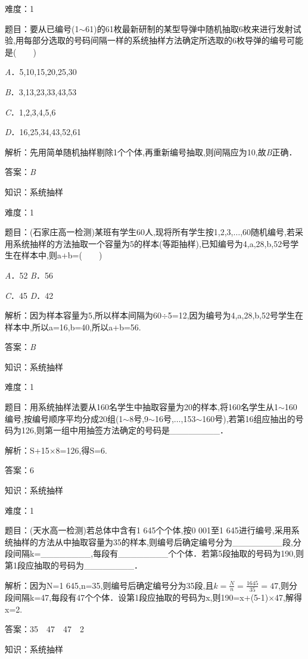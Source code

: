 \documentclass{article} %
\begin{document}
难度：1

题目：要从已编号(1$\sim$61)的61枚最新研制的某型导弹中随机抽取6枚来进行发射试验,用每部分选取的号码间隔一样的系统抽样方法确定所选取的6枚导弹的编号可能是(　　)

\textit{A}．5,10,15,20,25,30

\textit{B}．3,13,23,33,43,53

\textit{C}．1,2,3,4,5,6

\textit{D}．16,25,34,43,52,61

解析：先用简单随机抽样剔除1个个体,再重新编号抽取,则间隔应为10,故\textit{B}正确．

答案：\textit{B}

知识：系统抽样

难度：1

题目：(石家庄高一检测)某班有学生60人,现将所有学生按1,2,3,$\dots$,60随机编号,若采用系统抽样的方法抽取一个容量为5的样本(等距抽样),已知编号为4,a,28,b,52号学生在样本中,则a+b=(　　)

\textit{A}．52  \textit{B}．56

\textit{C}．45  \textit{D}．42

解析：因为样本容量为5,所以样本间隔为60$\mathrm{\div}$5=12,因为编号为4,a,28,b,52号学生在样本中,所以a=16,b=40,所以a+b=56.

答案：\textit{B}

知识：系统抽样

难度：1

题目：用系统抽样法要从160名学生中抽取容量为20的样本,将160名学生从1$\sim$160编号,按编号顺序平均分成20组(1$\sim$8号,9$\sim$16号,$\dots$,153$\sim$160号),若第16组应抽出的号码为126,则第一组中用抽签方法确定的号码是\_\_\_\_\_\_\_\_．

解析：S+15$\mathrm{\times}$8=126,得S=6.

答案：6

知识：系统抽样

难度：1

题目：(天水高一检测)若总体中含有1 645个个体,按0 001至1 645进行编号,采用系统抽样的方法从中抽取容量为35的样本,则编号后确定编号分为\_\_\_\_\_\_\_\_段,分段间隔k=\_\_\_\_\_\_\_\_,每段有\_\_\_\_\_\_\_\_个个体．若第5段抽取的号码为190,则第1段应抽取的号码为\_\_\_\_\_\_\_\_．

解析：因为N=1 645,n=35,则编号后确定编号分为35段,且$k=\frac{N}{n}=\frac{1645}{35}=47$,则分段间隔k=47,每段有47个个体．设第1段应抽取的号码为x,则190=x+(5-1)$\times$47,解得x=2.

答案：35　47　47　2

知识：系统抽样
\end{document}
